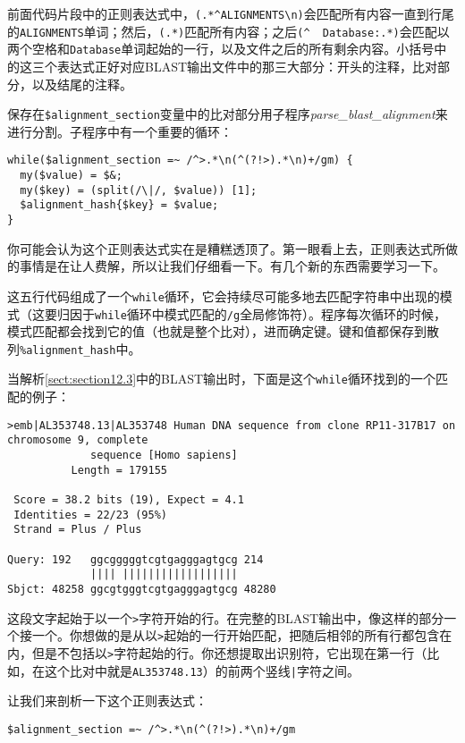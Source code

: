 前面代码片段中的正则表达式中，\verb|(.*^ALIGNMENTS\n)|会匹配所有内容一直到行尾的\verb|ALIGNMENTS|单词；然后，\verb|(.*)|匹配所有内容；之后\verb|(^  Database:.*)|会匹配以两个空格和\verb|Database|单词起始的一行，以及文件之后的所有剩余内容。小括号中的这三个表达式正好对应BLAST输出文件中的那三大部分：开头的注释，比对部分，以及结尾的注释。

保存在\verb|$alignment_section|变量中的比对部分用子程序\textit{parse\_blast\_alignment}来进行分割。子程序中有一个重要的循环：

\begin{lstlisting}
while($alignment_section =~ /^>.*\n(^(?!>).*\n)+/gm) {
  my($value) = $&;
  my($key) = (split(/\|/, $value)) [1];
  $alignment_hash{$key} = $value;
}
\end{lstlisting}

你可能会认为这个正则表达式实在是糟糕透顶了。第一眼看上去，正则表达式所做的事情是在让人费解，所以让我们仔细看一下。有几个新的东西需要学习一下。

这五行代码组成了一个\verb|while|循环，它会持续尽可能多地去匹配字符串中出现的模式（这要归因于\verb|while|循环中模式匹配的\verb|/g|全局修饰符）。程序每次循环的时候，模式匹配都会找到它的值（也就是整个比对），进而确定键。键和值都保存到散列\verb|%alignment_hash|中。

当解析\autoref{sect:section12.3}中的BLAST输出时，下面是这个\verb|while|循环找到的一个匹配的例子：

\begin{lstlisting}
>emb|AL353748.13|AL353748 Human DNA sequence from clone RP11-317B17 on
chromosome 9, complete
             sequence [Homo sapiens]
          Length = 179155

 Score = 38.2 bits (19), Expect = 4.1
 Identities = 22/23 (95%)
 Strand = Plus / Plus

Query: 192   ggcgggggtcgtgagggagtgcg 214
             |||| ||||||||||||||||||
Sbjct: 48258 ggcgtgggtcgtgagggagtgcg 48280
\end{lstlisting}

这段文字起始于以一个\verb|>|字符开始的行。在完整的BLAST输出中，像这样的部分一个接一个。你想做的是从以\verb|>|起始的一行开始匹配，把随后相邻的所有行都包含在内，但是不包括以\verb|>|字符起始的行。你还想提取出识别符，它出现在第一行（比如，在这个比对中就是\verb|AL353748.13|）的前两个竖线\verb=|=字符之间。

让我们来剖析一下这个正则表达式：

\begin{lstlisting}
$alignment_section =~ /^>.*\n(^(?!>).*\n)+/gm
\end{lstlisting}

